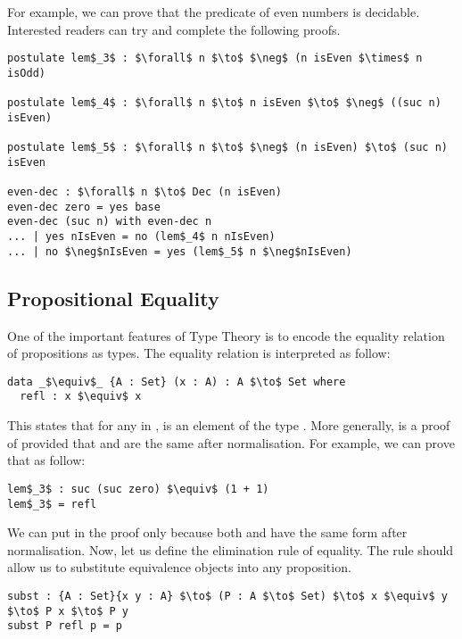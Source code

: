\par For example, we can prove that the predicate of even numbers is
decidable. Interested readers can try and complete the following proofs. 
\begin{lstlisting}[mathescape=true,xleftmargin=.25\textwidth]
postulate lem$_3$ : $\forall$ n $\to$ $\neg$ (n isEven $\times$ n isOdd)

postulate lem$_4$ : $\forall$ n $\to$ n isEven $\to$ $\neg$ ((suc n) isEven)

postulate lem$_5$ : $\forall$ n $\to$ $\neg$ (n isEven) $\to$ (suc n) isEven

even-dec : $\forall$ n $\to$ Dec (n isEven)
even-dec zero = yes base
even-dec (suc n) with even-dec n
... | yes nIsEven = no (lem$_4$ n nIsEven)
... | no $\neg$nIsEven = yes (lem$_5$ n $\neg$nIsEven)
\end{lstlisting} 


\subsection{Propositional Equality} 
\par One of the important features of Type Theory is
to encode the equality relation of propositions as types. The
equality relation is interpreted as follow:
\begin{lstlisting}[mathescape=true,xleftmargin=.25\textwidth]
data _$\equiv$_ {A : Set} (x : A) : A $\to$ Set where
  refl : x $\equiv$ x
\end{lstlisting}

\par This states that for any  in ,  is an
element of the type . More generally,  is a
proof of  provided that  and  are the same
after normalisation. For example, we can prove that  as follow:
\begin{lstlisting}[mathescape=true,xleftmargin=.25\textwidth]
lem$_3$ : suc (suc zero) $\equiv$ (1 + 1)
lem$_3$ = refl
\end{lstlisting}

\par We can put  in the proof only because both
 and  have the same form after
normalisation. Now, let us define the elimination rule of
equality. The rule should allow us to substitute equivalence objects
into any proposition. 
\begin{lstlisting}[mathescape=true,xleftmargin=.05\textwidth]
subst : {A : Set}{x y : A} $\to$ (P : A $\to$ Set) $\to$ x $\equiv$ y $\to$ P x $\to$ P y
subst P refl p = p 
\end{lstlisting}

